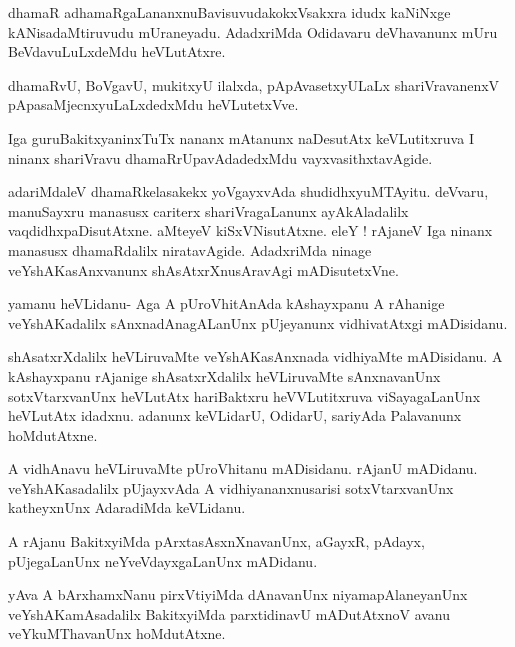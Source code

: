 \documentclass{article}
\begin{document}
\begin{mn}%
dhamaR adhamaRgaLananxnuBavisuvudakokxVsakxra idudx kaNiNxge kANisadaMtiruvudu mUraneyadu. 
AdadxriMda Odidavaru deVhavanunx mUru BeVdavuLuLxdeMdu heVLutAtxre.
\end{mn}

\begin{mn}%
dhamaRvU, BoVgavU, mukitxyU ilalxda, pApAvasetxyULaLx shariVravanenxV 
pApasaMjecnxyuLaLxdedxMdu heVLutetxVve.
\end{mn}

\begin{mn}%
Iga guruBakitxyaninxTuTx nananx mAtanunx naDesutAtx keVLutitxruva I ninanx shariVravu 
dhamaRrUpavAdadedxMdu vayxvasithxtavAgide.
\end{mn}

\begin{mn}%
adariMdaleV dhamaRkelasakekx yoVgayxvAda shudidhxyuMTAyitu. deVvaru, manuSayxru manasusx 
cariterx shariVragaLanunx ayAkAladalilx vaqdidhxpaDisutAtxne. aMteyeV kiSxVNisutAtxne. 
eleY ! rAjaneV Iga ninanx manasusx dhamaRdalilx niratavAgide. AdadxriMda ninage 
veYshAKasAnxvanunx shAsAtxrXnusAravAgi mADisutetxVne.
\end{mn}

\begin{mn}%
yamanu heVLidanu- Aga A pUroVhitAnAda kAshayxpanu A rAhanige veYshAKadalilx 
sAnxnadAnagALanUnx pUjeyanunx vidhivatAtxgi mADisidanu.
\end{mn}

\begin{mn}%
shAsatxrXdalilx heVLiruvaMte veYshAKasAnxnada vidhiyaMte mADisidanu. A kAshayxpanu 
rAjanige shAsatxrXdalilx heVLiruvaMte sAnxnavanUnx sotxVtarxvanUnx heVLutAtx hariBaktxru 
heVVLutitxruva viSayagaLanUnx heVLutAtx idadxnu. adanunx keVLidarU, OdidarU, sariyAda 
Palavanunx hoMdutAtxne.
\end{mn}

\begin{mn}%
A vidhAnavu heVLiruvaMte pUroVhitanu mADisidanu. rAjanU mADidanu. veYshAKasadalilx 
pUjayxvAda A vidhiyananxnusarisi sotxVtarxvanUnx katheyxnUnx AdaradiMda keVLidanu.
\end{mn}

\begin{mn}%
A rAjanu BakitxyiMda pArxtasAsxnXnavanUnx, aGayxR, pAdayx, pUjegaLanUnx neYveVdayxgaLanUnx 
mADidanu.
\end{mn}

\begin{mn}%
yAva A bArxhamxNanu pirxVtiyiMda dAnavanUnx niyamapAlaneyanUnx veYshAKamAsadalilx 
BakitxyiMda parxtidinavU mADutAtxnoV avanu veYkuMThavanUnx hoMdutAtxne.
\end{mn}
\end{document}
